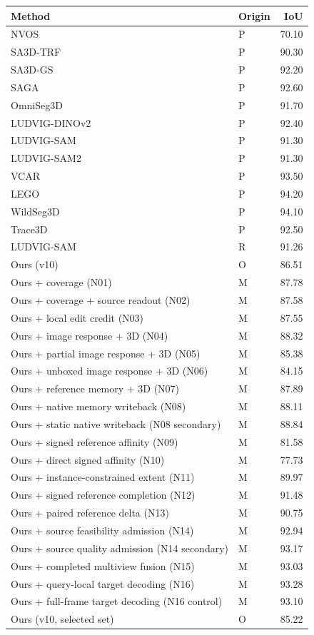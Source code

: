 \begin{tabular}{llr}
\toprule
Method & Origin & IoU \\
\midrule
NVOS \cite{ludvig} & P & 70.10 \\
SA3D-TRF \cite{ludvig} & P & 90.30 \\
SA3D-GS \cite{ludvig} & P & 92.20 \\
SAGA \cite{ludvig} & P & 92.60 \\
OmniSeg3D \cite{ludvig} & P & 91.70 \\
LUDVIG-DINOv2 \cite{ludvig} & P & 92.40 \\
LUDVIG-SAM \cite{ludvig} & P & 91.30 \\
LUDVIG-SAM2 \cite{ludvig} & P & 91.30 \\
VCAR \cite{vcar} & P & 93.50 \\
LEGO \cite{lego} & P & 94.20 \\
WildSeg3D \cite{wildseg3d} & P & 94.10 \\
Trace3D \cite{trace3d} & P & 92.50 \\
LUDVIG-SAM & R & 91.26 \\
Ours (v10) & O & 86.51 \\
Ours + coverage (N01) & M & 87.78 \\
Ours + coverage + source readout (N02) & M & 87.58 \\
Ours + local edit credit (N03) & M & 87.55 \\
Ours + image response + 3D (N04) & M & 88.32 \\
Ours + partial image response + 3D (N05) & M & 85.38 \\
Ours + unboxed image response + 3D (N06) & M & 84.15 \\
Ours + reference memory + 3D (N07) & M & 87.89 \\
Ours + native memory writeback (N08) & M & 88.11 \\
Ours + static native writeback (N08 secondary) & M & 88.84 \\
Ours + signed reference affinity (N09) & M & 81.58 \\
Ours + direct signed affinity (N10) & M & 77.73 \\
Ours + instance-constrained extent (N11) & M & 89.97 \\
Ours + signed reference completion (N12) & M & 91.48 \\
Ours + paired reference delta (N13) & M & 90.75 \\
Ours + source feasibility admission (N14) & M & 92.94 \\
Ours + source quality admission (N14 secondary) & M & 93.17 \\
Ours + completed multiview fusion (N15) & M & 93.03 \\
Ours + query-local target decoding (N16) & M & 93.28 \\
Ours + full-frame target decoding (N16 control) & M & 93.10 \\
Ours (v10, selected set) & O & 85.22 \\
\bottomrule
\end{tabular}
